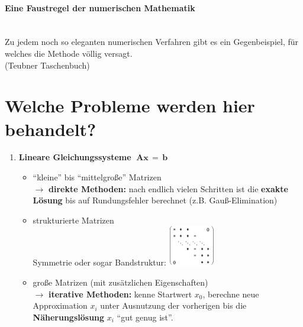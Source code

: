\documentclass[ngerman,fontsize=11pt, paper=a4, parskip=half, titlepage=true, toc=bib]{scrbook}
\begin{document}
\paragraph{Eine Faustregel der numerischen Mathematik}~\\
Zu jedem noch so eleganten numerischen Verfahren gibt es ein Gegenbeispiel,
für welches die Methode völlig versagt. \\
{\tiny(Teubner Taschenbuch)}

\section*{Welche Probleme werden hier behandelt?}
\begin{enumerate}
\item \textbf{Lineare Gleichungssysteme} $\; \boldsymbol A \boldsymbol x \, = \, \boldsymbol b$ 
  \begin{itemize}
  \item \enquote{kleine} bis \enquote{mittelgroße} Matrizen\\
    $\rightarrow$ \textbf{direkte Methoden:} nach endlich vielen
    Schritten ist die \textbf{exakte Lösung} bis auf
    Rundungsfehler berechnet (z.B. Gauß-Elimination)
  \item strukturierte Matrizen \\
    Symmetrie oder sogar Bandstruktur: \hspace*{1cm}  
    \includegraphics[width=2cm]{images/band.jpg}
    
  \item große Matrizen (mit zusätzlichen Eigenschaften)\\
    $\rightarrow$ \textbf{iterative Methoden:} kenne Startwert
    $x_0$, berechne neue Approximation $x_i$ unter
    Ausnutzung der vorherigen bis die
    \textbf{Näherungslösung} $x_i$ \enquote{gut genug ist}.
  \end{itemize}
  

\end{enumerate}
\end{document}
